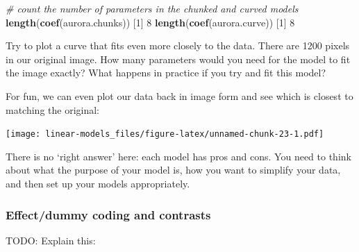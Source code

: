 \documentclass[]{article}
\newenvironment{Shaded}{\begin{snugshade}}{\end{snugshade}}
\newcommand{\CommentTok}[1]{\textcolor[rgb]{0.56,0.35,0.01}{\textit{#1}}}
\newcommand{\DecValTok}[1]{\textcolor[rgb]{0.00,0.00,0.81}{#1}}
\newcommand{\KeywordTok}[1]{\textcolor[rgb]{0.13,0.29,0.53}{\textbf{#1}}}
\newcommand{\NormalTok}[1]{#1}
\begin{document}
\begin{Shaded}
\begin{Highlighting}[]
\CommentTok{# count the number of parameters in the chunked and curved models}
\KeywordTok{length}\NormalTok{(}\KeywordTok{coef}\NormalTok{(aurora.chunks))}
\NormalTok{[}\DecValTok{1}\NormalTok{] }\DecValTok{8}
\KeywordTok{length}\NormalTok{(}\KeywordTok{coef}\NormalTok{(aurora.curve))}
\NormalTok{[}\DecValTok{1}\NormalTok{] }\DecValTok{8}
\end{Highlighting}
\end{Shaded}

{Try to plot a curve that fits even more closely to the data. There are 1200
pixels in our original image. How many parameters would you need for the model
to fit the image exactly? What happens in practice if you try and fit this
model?}

For fun, we can even plot our data back in image form and see which is closest
to matching the original:

\texttt{[image: linear-models\_files/figure-latex/unnamed-chunk-23-1.pdf]}

{There is no `right answer' here: each model has pros and cons. You need to
think about what the purpose of your model is, how you want to simplify your
data, and then set up your models appropriately.}

\hypertarget{regression-coding}{%
\subsubsection*{Effect/dummy coding and contrasts}\label{regression-coding}}

TODO: Explain this:
\end{document}
